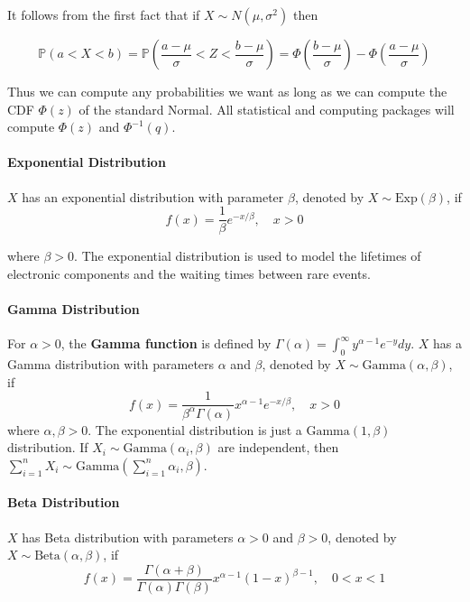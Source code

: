 It follows from the first fact that if \(X \sim N(\mu, \sigma^{2})\) then

\[ 
\mathbb{P}(a < X < b) 
= \mathbb{P}\left( \frac{a - \mu}{\sigma} < Z < \frac{b - \mu}{\sigma} \right) 
= \Phi \left( \frac{b - \mu}{\sigma} \right) - \Phi \left( \frac{a - \mu}{\sigma} \right)
\]

Thus we can compute any probabilities we want as long as we can compute the CDF \(\Phi(z)\) of the standard Normal. All statistical and computing packages will compute \(\Phi(z)\) and \(\Phi^{-1}(q)\).

\paragraph{Exponential Distribution}\label{exponential-distribution}

\(X\) has an exponential distribution with parameter \(\beta\), denoted by \(X \sim \text{Exp}(\beta)\), if
\[ 
f(x) = \frac{1}{\beta} e^{-x / \beta}, \quad x > 0
\]

where \(\beta > 0\). The exponential distribution is used to model the lifetimes of electronic components and the waiting times between rare events.

\paragraph{Gamma Distribution}\label{gamma-distribution}

For \(\alpha > 0\), the \textbf{Gamma function} is defined by \(\Gamma(\alpha) = \int_{0}^{\infty} y^{\alpha - 1} e^{-y} dy\). \(X\) has a Gamma distribution with parameters \(\alpha\) and \(\beta\), denoted by \(X \sim \text{Gamma}(\alpha, \beta)\), if
\[
f(x) = \frac{1}{\beta^\alpha \Gamma(\alpha)} x^{\alpha - 1} e^{-x / \beta}, \quad x > 0
\]
where \(\alpha, \beta > 0\). The exponential distribution is just a \(\text{Gamma}(1, \beta)\) distribution. If \(X_{i} \sim \text{Gamma}(\alpha_{i}, \beta)\) are independent, then \(\sum_{i=1}^{n} X_{i} \sim \text{Gamma}\left( \sum_{i=1}^{n} \alpha_{i}, \beta \right)\).

\paragraph{Beta Distribution}\label{beta-distribution}

\(X\) has Beta distribution with parameters \(\alpha > 0\) and \(\beta > 0\), denoted by \(X \sim \text{Beta}(\alpha, \beta)\), if
\[
f(x) = \frac{\Gamma(\alpha + \beta)}{\Gamma(\alpha) \Gamma(\beta)} x^{\alpha - 1} (1 - x)^{\beta - 1}, \quad 0 < x < 1
\]

